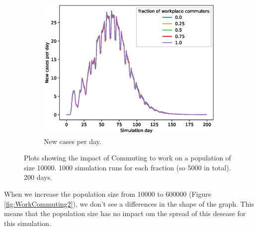 \documentclass[runningheads]{llncs}
\begin{document}
\begin{figure}[h!]
	\centering
	\begin{subfigure}[b]{0.7\linewidth}
		\includegraphics[width=\textwidth]{work_cases_per_day_3.eps}
		\caption{New cases per day.} 
	\end{subfigure}
	\caption{Plots showing the impact of Commuting to work on a population of size 10000. 1000 simulation runs for each fraction (so 5000 in total). 200 days.}
	\label{fig:WorkCommuting1}
\end{figure}

\noindent
When we increase the population size from 10000 to 600000 (Figure \ref{fig:WorkCommuting2}), we don't see a differences in the shape of the graph. This means that the population size has no impact om the spread of this desease for this simulation. 
\end{document}
